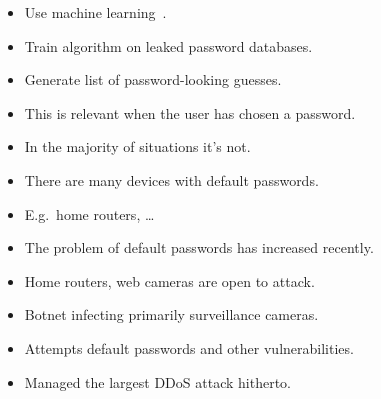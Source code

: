 \begin{frame}
  \begin{example}
    \begin{itemize}
      \item Use machine learning~\cite{JohnTheRipper,OMEN,WeirPCFG}.
      \item Train algorithm on leaked password databases.
      \item Generate list of password-looking guesses.
    \end{itemize}
  \end{example}
\end{frame}

\begin{frame}
  \begin{remark}
    \begin{itemize}
      \item This is relevant when the user has chosen a password.
      \item In the majority of situations it's not.
    \end{itemize}
  \end{remark}

  \pause{}

  \begin{example}
    \begin{itemize}
      \item There are many devices with default passwords.
      \item E.g.\ home routers, \dots
    \end{itemize}
  \end{example}
\end{frame}

\begin{frame}
  \begin{remark}
    \begin{itemize}
      \item The problem of default passwords has increased recently.
      \item Home routers, web cameras are open to attack.
    \end{itemize}
  \end{remark}

  \pause{}

  \begin{example}
    \begin{itemize}
      \item Botnet infecting primarily surveillance cameras.
      \item Attempts default passwords and other vulnerabilities.
      \item Managed the largest \ac{DDoS} attack hitherto.
    \end{itemize}
  \end{example}
\end{frame}

